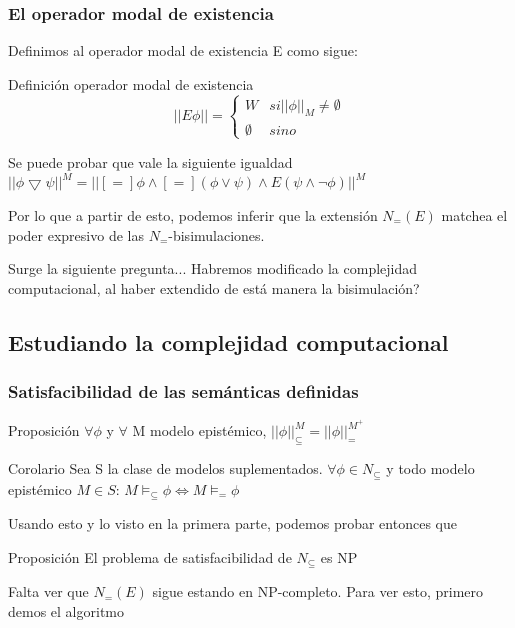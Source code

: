 \documentclass{beamer}
\begin{document}
\begin{frame}
\frametitle{El operador modal de existencia}

Definimos al operador modal de existencia E como sigue:

\begin{block}{Definici\'on operador modal de existencia}
\[ ||E\phi|| = \begin{cases} 
      W & si ||\phi||_{M} \neq \emptyset \\
      \emptyset & sino
   \end{cases}
\]
\end{block}

Se puede probar que vale la siguiente igualdad
$||\phi \bigtriangledown \psi||^{M} = ||[=]\phi \land [=](\phi \lor \psi) \land E(\psi \land \neg \phi)||^{M}$

Por lo que a partir de esto, podemos inferir que la extensi\'on $N_{=}(E)$ matchea el poder expresivo de las $N_{=}$-bisimulaciones.

Surge la siguiente pregunta... Habremos modificado la complejidad computacional, al haber extendido de est\'a manera la bisimulaci\'on?
\end{frame}

\subsection{Estudiando la complejidad computacional}

\begin{frame}
\frametitle {Satisfacibilidad de las sem\'anticas definidas}

\begin{block}{Proposici\'on}
$\forall \phi$ y $\forall$ M modelo epist\'emico, $||\phi||_{\subseteq}^{M} = ||\phi||_{=}^{M^{+}}$ 
\end{block}

\begin{block}{Corolario}
Sea S la clase de modelos suplementados. $\forall \phi \in N_{\subseteq}$ y todo modelo epist\'emico $M \in S$: $M \models_{\subseteq}\phi \iff M \models_{=}\phi$
\end{block}

Usando esto y lo visto en la primera parte, podemos probar entonces que
\begin{block}{Proposici\'on}
El problema de satisfacibilidad de $N_{\subseteq}$ es NP
\end{block}

Falta ver que $N_{=}(E)$ sigue estando en NP-completo. Para ver esto, primero demos el algoritmo

\end{frame}
\end{document}

